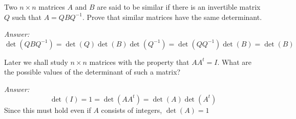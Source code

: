 \documentclass[letterpaper]{article}
\newcommand{\ans}{\textit{Answer: }}
\newenvironment{question}[2][Question]{\begin{trivlist}
\item[\hskip \labelsep {\bfseries #1}\hskip \labelsep {\bfseries #2.}]}{\end{trivlist}}
\begin{document}
\begin{question}{4.25}
  Two $n \times n$ matrices $A$ and $B$ are said to be similar if there is an invertible
  matrix $Q$ such that $A=Q B Q^{-1} .$ Prove that similar matrices have the same
  determinant.

  \ans 
  $$\det(Q B Q^{-1}) = \det(Q)\det(B)\det(Q^{-1}) = \det(QQ^{-1})\det(B) = \det(B)$$
  
\end{question}

\begin{question}{4.26}
  Later we shall study $n \times n$ matrices with the property that $A A^{t}=I .$ What are
  the possible values of the determinant of such a matrix?

  \ans
  $$\det(I) = 1 = \det(AA^t) = \det(A) \det(A^t)$$
  Since this must hold even if $A$ consists of integers, $\det(A) = 1$
  
\end{question}
\end{document}

